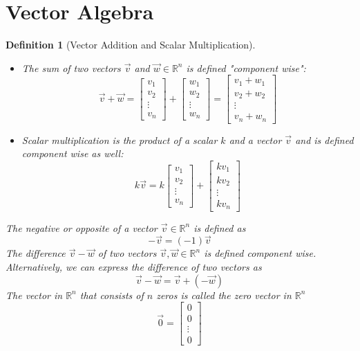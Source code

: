 \documentclass[10pt]{report}
\newtheorem{def2}{Definition}[section]
\begin{document}
\section{Vector Algebra}
\begin{def2}[Vector Addition and Scalar Multiplication]
\begin{itemize}
\item[a.] The sum of two vectors $\vec{v}$ and $\vec{w}\in\mathbb{R}^n$ is defined "component wise":
$$\vec{v} + \vec{w}=\left[ \begin{array}{c}
v_1\\
v_2\\
\vdots\\
v_n
\end{array}\right]+\left[ \begin{array}{c}
w_1\\
w_2\\
\vdots\\
w_n
\end{array}\right]=\left[ \begin{array}{c}
v_1+w_1\\
v_2+w_2\\
\vdots\\
v_n+w_n
\end{array}\right]$$
\item[b.] Scalar multiplication is the product of a scalar $k$ and a vector $\vec{v}$ and is defined component wise as well:
$$k\vec{v}=k\left[ \begin{array}{c}
v_1\\
v_2\\
\vdots\\
v_n
\end{array}\right]+\left[ \begin{array}{c}
kv_1\\
kv_2\\
\vdots\\
kv_n
\end{array}\right]$$
\end{itemize}
The negative or opposite of a vector $\vec{v}\in\mathbb{R}^n$ is defined as
$$-\vec{v}=(-1)\vec{v}$$
The difference $\vec{v}-\vec{w}$ of two vectors $\vec{v},\vec{w}\in\mathbb{R}^n$ is defined component wise. Alternatively, we can express the difference of two vectors as
$$\vec{v}-\vec{w}=\vec{v}+(-\vec{w})$$
The vector in $\mathbb{R}^n$ that consists of $n$ zeros is called the zero vector in $\mathbb{R}^n$
$$\vec{0}=\left[ \begin{array}{c}
0\\
0\\
\vdots\\
0
\end{array}\right]$$ 
\end{def2}
\end{document}
